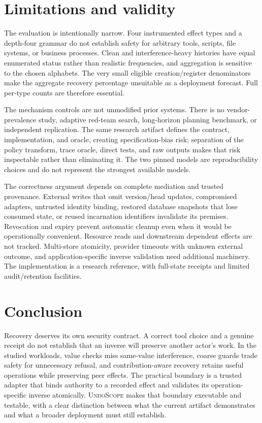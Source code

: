 \documentclass[10pt,twocolumn]{article}
\newcommand{\US}{\textsc{UndoScope}}
\begin{document}
\section{Limitations and validity}
The evaluation is intentionally narrow. Four instrumented effect types and a depth-four grammar do not establish safety for arbitrary tools, scripts, file systems, or business processes. Clean and interference-heavy histories have equal enumerated status rather than realistic frequencies, and aggregation is sensitive to the chosen alphabets. The very small eligible creation/register denominators make the aggregate recovery percentage unsuitable as a deployment forecast. Full per-type counts are therefore essential.

The mechanism controls are not unmodified prior systems. There is no vendor-prevalence study, adaptive red-team search, long-horizon planning benchmark, or independent replication. The same research artifact defines the contract, implementation, and oracle, creating specification-bias risk; separation of the policy transform, trace oracle, direct tests, and raw outputs makes that risk inspectable rather than eliminating it. The two pinned models are reproducibility choices and do not represent the strongest available models.

The correctness argument depends on complete mediation and trusted provenance. External writes that omit version/head updates, compromised adapters, untrusted identity binding, restored database snapshots that lose consumed state, or reused incarnation identifiers invalidate its premises. Revocation and expiry prevent automatic cleanup even when it would be operationally convenient. Resource reads and downstream dependent effects are not tracked. Multi-store atomicity, provider timeouts with unknown external outcome, and application-specific inverse validation need additional machinery. The implementation is a research reference, with full-state receipts and limited audit/retention facilities.

\section{Conclusion}
Recovery deserves its own security contract. A correct tool choice and a genuine receipt do not establish that an inverse will preserve another actor's work. In the studied workloads, value checks miss same-value interference, coarse guards trade safety for unnecessary refusal, and contribution-aware recovery retains useful operations while preserving peer effects. The practical boundary is a trusted adapter that binds authority to a recorded effect and validates its operation-specific inverse atomically. \US{} makes that boundary executable and testable, with a clear distinction between what the current artifact demonstrates and what a broader deployment must still establish.
\end{document}
